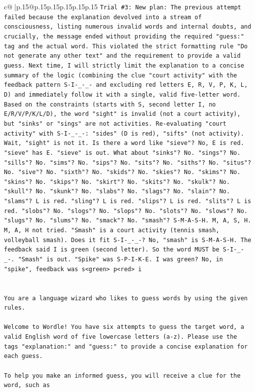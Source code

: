 \documentclass{article}
\begin{document}
{\begin{supertabular}{c@{$\;$}|p{.15\linewidth}@{}p{.15\linewidth}p{.15\linewidth}p{.15\linewidth}p{.15\linewidth}p{.15\linewidth}}
{{{\texttt{Trial \#3: New plan: The previous attempt failed because the explanation devolved into a stream of consciousness, listing numerous invalid words and internal doubts, and crucially, the message ended without providing the required "guess:" tag and the actual word. This violated the strict formatting rule "Do not generate any other text" and the requirement to provide a valid guess. Next time, I will strictly limit the explanation to a concise summary of the logic (combining the clue "court activity" with the feedback pattern S{-}I{-}\_{-}\_{-} and excluding red letters E, R, V, P, K, L, D) and immediately follow it with a single, valid five{-}letter word. Based on the constraints (starts with S, second letter I, no E/R/V/P/K/L/D), the word "sight" is invalid (not a court activity), but "sinks" or "sings" are not activities. Re{-}evaluating "court activity" with S{-}I{-}\_{-}\_{-}: "sides" (D is red), "sifts" (not activity). Wait, "sight" is not it. Is there a word like "sieve"? No, E is red. "sieve" has E. "sieve" is out. What about "sinks"? No. "sings"? No. "sills"? No. "sims"? No. "sips"? No. "sits"? No. "siths"? No. "situs"? No. "sive"? No. "sixth"? No. "skids"? No. "skies"? No. "skims"? No. "skins"? No. "skips"? No. "skirt"? No. "skits"? No. "skulk"? No. "skull"? No. "skunk"? No. "slabs"? No. "slags"? No. "slain"? No. "slams"? L is red. "sling"? L is red. "slips"? L is red. "slits"? L is red. "slobs"? No. "slogs"? No. "slops"? No. "slots"? No. "slows"? No. "slugs"? No. "slums"? No. "smack"? No. "smash"? S{-}M{-}A{-}S{-}H. M, A, S, H. M, A, H not tried. "Smash" is a court activity (tennis smash, volleyball smash). Does it fit S{-}I{-}\_{-}\_{-}? No, "smash" is S{-}M{-}A{-}S{-}H. The feedback said I is green (second letter). So the word MUST be S{-}I{-}\_{-}\_{-}. "Smash" is out. "Spike" was S{-}P{-}I{-}K{-}E. I was green? No, in "spike", feedback was s<green> p<red> i} \\
\\ 
\\ 
\texttt{You are a language wizard who likes to guess words by using the given rules.} \\
\\ 
\texttt{Welcome to Wordle! You have six attempts to guess the target word, a valid English word of five lowercase letters (a{-}z). Please use the tags "explanation:" and "guess:" to provide a concise explanation for each guess.} \\
\\ 
\texttt{To help you make an informed guess, you will receive a clue for the word, such as} \\
}}}
\end{supertabular}}
\end{document}

